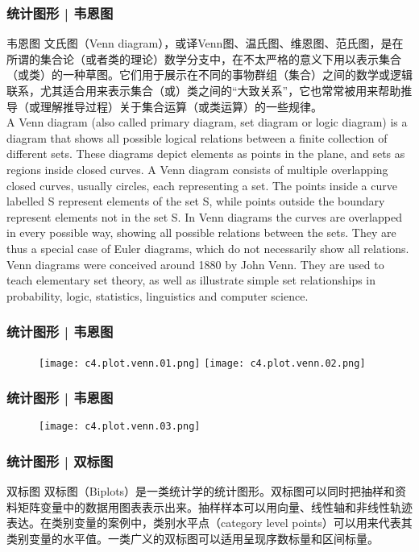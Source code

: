 \begin{frame}
  \frametitle{统计图形 | 韦恩图}
  \begin{block}{韦恩图}
    {\footnotesize
      文氏图（Venn diagram），或译Venn图、温氏图、维恩图、范氏图，是在所谓的集合论（或者类的理论）数学分支中，在不太严格的意义下用以表示集合（或类）的一种草图。它们用于展示在不同的事物群组（集合）之间的数学或逻辑联系，尤其\alert{适合用来表示集合（或）类之间的“大致关系”}，它也常常被用来帮助推导（或理解推导过程）关于集合运算（或类运算）的一些规律。\\
    \vspace{0.5em}
    A Venn diagram (also called primary diagram, set diagram or logic diagram) is a diagram that shows all possible logical relations between a finite collection of different sets. These diagrams depict elements as points in the plane, and sets as regions inside closed curves. A Venn diagram consists of multiple overlapping closed curves, usually circles, each representing a set. The points inside a curve labelled S represent elements of the set S, while points outside the boundary represent elements not in the set S. In Venn diagrams the curves are overlapped in every possible way, showing all possible relations between the sets. They are thus a special case of Euler diagrams, which do not necessarily show all relations. Venn diagrams were conceived around 1880 by John Venn. They are used to teach elementary set theory, as well as illustrate simple set relationships in probability, logic, statistics, linguistics and computer science.\\
  }
  \end{block}
\end{frame}

\begin{frame}
  \frametitle{统计图形 | 韦恩图}
  \begin{figure}
    \centering
    \texttt{[image: c4.plot.venn.01.png]}
    \texttt{[image: c4.plot.venn.02.png]}
  \end{figure}
\end{frame}

\begin{frame}
  \frametitle{统计图形 | 韦恩图}
  \begin{figure}
    \centering
    \texttt{[image: c4.plot.venn.03.png]}
  \end{figure}
\end{frame}

\begin{frame}
  \frametitle{统计图形 | 双标图}
  \begin{block}{双标图}
双标图（Biplots）是一类统计学的统计图形。双标图可以同时把抽样和资料矩阵变量中的数据用图表表示出来。抽样样本可以用向量、线性轴和非线性轨迹表达。在类别变量的案例中，类别水平点（category level points）可以用来代表其类别变量的水平值。一类广义的双标图可以适用呈现序数标量和区间标量。
  \end{block}
\end{frame}

